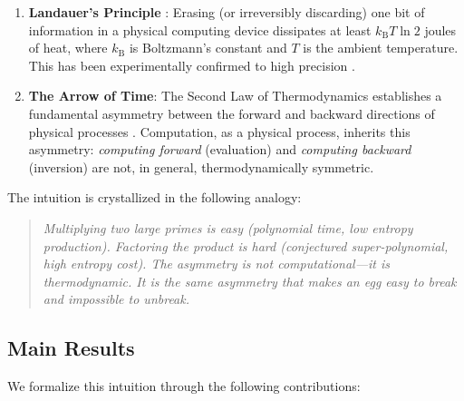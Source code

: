 \documentclass[12pt, a4paper]{article}
\theoremstyle{plain}
\theoremstyle{definition}
\theoremstyle{remark}
\newcommand{\kB}{k_{\mathrm{B}}}
\begin{document}
\begin{enumerate}[label=(\alph*)]
  \item \textbf{Landauer's Principle} \citep{Landauer1961}: Erasing
    (or irreversibly discarding) one bit of information in a physical
    computing device dissipates at least $\kB T \ln 2$ joules of heat,
    where $\kB$ is Boltzmann's constant and $T$ is the ambient temperature.
    This has been experimentally confirmed to high precision
    \citep{BeruttEtAl2012}.

  \item \textbf{The Arrow of Time}: The Second Law of Thermodynamics
    establishes a fundamental asymmetry between the forward and backward
    directions of physical processes \citep{Boltzmann1877}. Computation,
    as a physical process, inherits this asymmetry: \emph{computing forward}
    (evaluation) and \emph{computing backward} (inversion) are not, in
    general, thermodynamically symmetric.
\end{enumerate}

The intuition is crystallized in the following analogy:
\begin{quote}
  \emph{Multiplying two large primes is easy (polynomial time, low entropy
  production). Factoring the product is hard (conjectured super-polynomial,
  high entropy cost). The asymmetry is not computational---it is
  thermodynamic. It is the same asymmetry that makes an egg easy to break
  and impossible to unbreak.}
\end{quote}

\subsection{Main Results}

We formalize this intuition through the following contributions:
\end{document}
